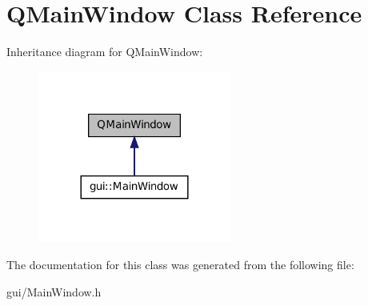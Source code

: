 \hypertarget{class_q_main_window}{
\section{QMainWindow Class Reference}
\label{class_q_main_window}
}


Inheritance diagram for QMainWindow:\nopagebreak
\begin{figure}[H]
\begin{center}
\leavevmode
\includegraphics[width=180pt]{class_q_main_window__inherit__graph}
\end{center}
\end{figure}


The documentation for this class was generated from the following file:\begin{DoxyCompactItemize}
\item 
gui/MainWindow.h\end{DoxyCompactItemize}
